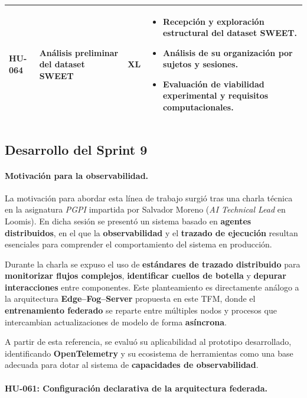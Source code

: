 \documentclass{report}
\begin{document}
\begin{table}[H]
\begin{tabular}{|l|p{4.8cm}|c|p{5.6cm}|}
HU-064 &
Análisis preliminar del dataset SWEET &
XL &
\begin{itemize}\setlength\itemsep{0.15em}
  \item Recepción y exploración estructural del dataset SWEET.
  \item Análisis de su organización por sujetos y sesiones.
  \item Evaluación de viabilidad experimental y requisitos computacionales.
\end{itemize}
\\ \hline

\end{tabular}
\end{table}


\subsection{Desarrollo del Sprint 9}
\vspace{0.15em}
\paragraph{Motivación para la observabilidad.}

La motivación para abordar esta línea de trabajo surgió tras una charla técnica en la asignatura \textit{PGPI} impartida por Salvador Moreno (\textit{AI Technical Lead} en Loomis). En dicha sesión se presentó un sistema basado en \textbf{agentes distribuidos}, en el que la \textbf{observabilidad} y el \textbf{trazado de ejecución} resultan esenciales para comprender el comportamiento del sistema en producción.

Durante la charla se expuso el uso de \textbf{estándares de trazado distribuido} para \textbf{monitorizar flujos complejos}, \textbf{identificar cuellos de botella} y \textbf{depurar interacciones} entre componentes. Este planteamiento es directamente análogo a la arquitectura \textbf{Edge--Fog--Server} propuesta en este TFM, donde el \textbf{entrenamiento federado} se reparte entre múltiples nodos y procesos que intercambian actualizaciones de modelo de forma \textbf{asíncrona}.

A partir de esta referencia, se evaluó su aplicabilidad al prototipo desarrollado, identificando \textbf{OpenTelemetry} y su ecosistema de herramientas como una base adecuada para dotar al sistema de \textbf{capacidades de observabilidad}.

\vspace{0.15em}
\paragraph{HU-061: Configuración declarativa de la arquitectura federada.}
\end{document}

